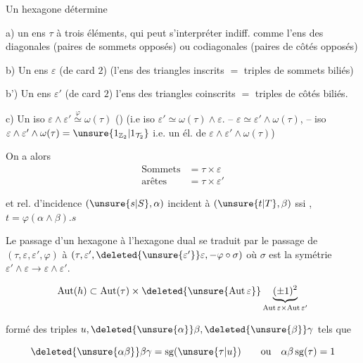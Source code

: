 Un hexagone détermine

a) un ens $\tau$ à trois éléments, qui peut s'interpréter indiff. comme l'ens des diagonales (paires de sommets opposés) ou codiagonales (paires de côtés opposés)

b) Un ens $\varepsilon$ (de card $2$)  (l'ens des triangles inscrits $=$ triples de sommets biliés)

b') Un ens $\varepsilon'$ (de card $2$) l'ens des triangles coinscrits $=$ triples de côtés biliés.

c) Un iso $\varepsilon\wedge\varepsilon'\overset{\varphi}{\simeq}\omega(\tau)$ ()  (i.e iso $\varepsilon'\simeq\omega(\tau)\wedge\varepsilon$. -- $\varepsilon\simeq\varepsilon'\wedge\omega(\tau)$, -- iso $\varepsilon\wedge\varepsilon'\wedge\omega(\tau)=\unsure{1_{\mathbb Z_2}|1_{\mathcal T_2}}$ i.e. un él. de $\varepsilon\wedge\varepsilon'\wedge\omega(\tau)$)

On a alors
\[
\begin{aligned}
\text{Sommets}&=\tau\times\varepsilon\\
\text{arêtes}&=\tau\times\varepsilon'
\end{aligned}
\]

et rel. d'incidence $(\unsure{s|S},\alpha)$ incident à $(\unsure{t|T},\beta)$ ssi , $t=\varphi(\alpha\wedge\beta).s$


Le passage d'un hexagone à l'hexagone dual se traduit par le passage de $(\tau,\varepsilon,\varepsilon',\varphi)$ à $(\tau,\varepsilon',\deleted{\unsure{\varepsilon'}}\varepsilon,-\varphi\circ\sigma)$ où $\sigma$ est la symétrie $\varepsilon'\wedge\varepsilon\to\varepsilon\wedge\varepsilon'$.

\[
\mathrm{Aut}(h)\subset\mathrm{Aut}(\tau)\times\deleted{\unsure{\mathrm{Aut}\,\varepsilon}}\underbrace{(\pm1)^2}_{\mathrm{Aut}\,\varepsilon\times\mathrm{Aut}\,\varepsilon'}
\]

formé des triples $u,\deleted{\unsure{\alpha}}\beta,\deleted{\unsure{\beta}}\gamma$ tels que

\[
\deleted{\unsure{\alpha\beta}}\beta\gamma=\mathrm{sg}(\unsure{\tau|u})\qquad\text{ou}\quad\alpha\beta\,\mathrm{sg}(\tau)=1
\]

